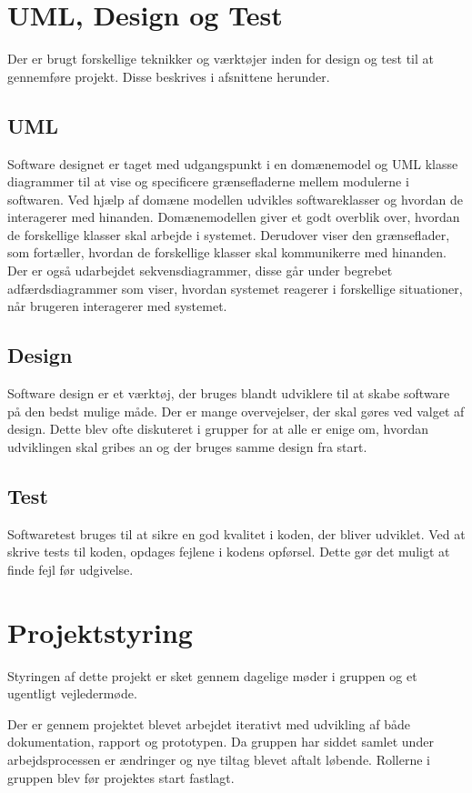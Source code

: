 \section{UML, Design og Test}
Der er brugt forskellige teknikker og værktøjer inden for design og test til at gennemføre projekt. Disse beskrives i afsnittene herunder.
\subsection{UML}
Software designet er taget med udgangspunkt i en domænemodel og UML\cite{UML} klasse diagrammer til at vise og specificere grænsefladerne mellem modulerne i softwaren.
Ved hjælp af domæne modellen udvikles softwareklasser og hvordan de interagerer med hinanden.
Domænemodellen giver et godt overblik over, hvordan de forskellige klasser skal arbejde i systemet. Derudover viser den grænseflader, som fortæller, hvordan de forskellige klasser skal kommunikerre med hinanden.
Der er også udarbejdet sekvensdiagrammer, disse går under begrebet adfærdsdiagrammer som viser, hvordan systemet reagerer i forskellige situationer, når brugeren interagerer med systemet.

\subsection{Design}
Software design er et værktøj, der bruges blandt udviklere til at skabe software på den bedst mulige måde. Der er mange overvejelser, der skal gøres ved valget af design. Dette blev ofte diskuteret i grupper for at alle er enige om, hvordan udviklingen skal gribes an og der bruges samme design fra start.

\subsection{Test}
Softwaretest bruges til at sikre en god kvalitet i koden, der bliver udviklet. Ved at skrive tests til koden, opdages fejlene i kodens opførsel. Dette gør det muligt at finde fejl før udgivelse.
\newline

\section{Projektstyring}
Styringen af dette projekt er sket gennem dagelige møder i gruppen og et ugentligt vejledermøde.
 
Der er gennem projektet blevet arbejdet iterativt med udvikling af både dokumentation, rapport og prototypen. Da gruppen har siddet samlet under arbejdsprocessen er ændringer og nye tiltag blevet aftalt løbende.
Rollerne i gruppen blev før projektes start fastlagt.

